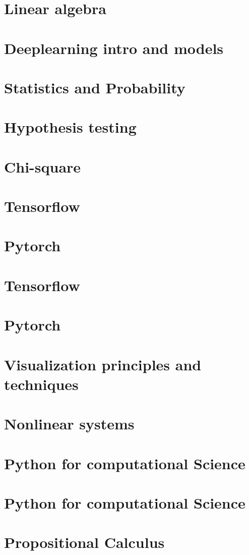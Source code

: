 \documentclass[11pt,fleqn]{book} %
\begin{document}
\chapter{Linear algebra}
\chapter{Deeplearning intro and models}
\chapter{Statistics and Probability}
\chapter{Hypothesis testing}
\chapter{Chi-square}
\chapter{Tensorflow}
\chapter{Pytorch}
\chapter{Tensorflow}
\chapter{Pytorch }
\chapter{Visualization principles and techniques}
\chapter{Nonlinear systems}
\chapter{Python for computational Science}
\chapter{Python for computational Science}
\chapter{Propositional Calculus}
\end{document}
